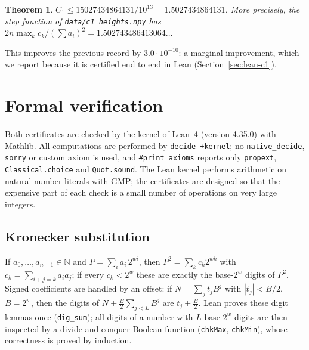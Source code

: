 \documentclass[11pt]{article}
\numberwithin{equation}{section}
\newtheorem{theorem}{Theorem}[section]
\theoremstyle{definition}
\theoremstyle{remark}
\begin{document}
\begin{theorem}\label{thm:c1}
$C_1\le 15027434864131/10^{13}=1.5027434864131$. More precisely, the step function of
\texttt{data/c1\_heights.npy} has $2n\max_k c_k/(\sum a_i)^2=1.502743486413064\ldots$
\end{theorem}
This improves the previous record by $3.0\cdot10^{-10}$: a marginal improvement, which we report because
it is certified end to end in Lean (Section~\ref{sec:lean-c1}).
\section{Formal verification}\label{sec:lean}

Both certificates are checked by the kernel of Lean~4 (version 4.35.0) with Mathlib. All computations
are performed by \texttt{decide +kernel}; no \texttt{native\_decide}, \texttt{sorry} or custom axiom is
used, and \texttt{\#print axioms} reports only \texttt{propext}, \texttt{Classical.choice} and
\texttt{Quot.sound}. The Lean kernel performs arithmetic on natural-number literals with GMP; the
certificates are designed so that the expensive part of each check is a small number of operations on
very large integers.

\subsection{Kronecker substitution}\label{sec:kron}
If $a_0,\dots,a_{n-1}\in\mathbb N$ and $P=\sum_i a_i\,2^{wi}$, then $P^2=\sum_k c_k 2^{wk}$ with
$c_k=\sum_{i+j=k}a_ia_j$; if every $c_k<2^w$ these are exactly the base-$2^w$ digits of $P^2$. Signed
coefficients are handled by an offset: if $N=\sum_j t_j B^j$ with $|t_j|<B/2$, $B=2^w$, then the digits of
$N+\frac B2\sum_{j<L}B^j$ are $t_j+\frac B2$. Lean proves these digit lemmas once (\texttt{dig\_sum}); all
digits of a number with $L$ base-$2^w$ digits are then inspected by a divide-and-conquer Boolean function
(\texttt{chkMax}, \texttt{chkMin}), whose correctness is proved by induction.
\end{document}
